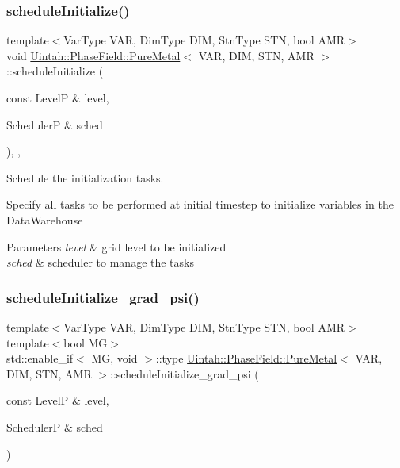\subsubsection{\texorpdfstring{schedule\+Initialize()}{scheduleInitialize()}}
{\footnotesize\ttfamily template$<$Var\+Type V\+AR, Dim\+Type D\+IM, Stn\+Type S\+TN, bool A\+MR$>$ \\
void \hyperlink{classUintah_1_1PhaseField_1_1PureMetal}{Uintah\+::\+Phase\+Field\+::\+Pure\+Metal}$<$ V\+AR, D\+IM, S\+TN, A\+MR $>$\+::schedule\+Initialize (\begin{DoxyParamCaption}\item[{const LevelP \&}]{level,  }\item[{SchedulerP \&}]{sched }\end{DoxyParamCaption})\hspace{0.3cm}{\ttfamily [override]}, {\ttfamily [protected]}, {\ttfamily [virtual]}}



Schedule the initialization tasks. 

Specify all tasks to be performed at initial timestep to initialize variables in the Data\+Warehouse


\begin{DoxyParams}{Parameters}
{\em level} & grid level to be initialized \\
\hline
{\em sched} & scheduler to manage the tasks \\
\hline
\end{DoxyParams}
\mbox{\label{classUintah_1_1PhaseField_1_1PureMetal_a08fd26626ff3782a5805db3725d2da25}} 
\subsubsection{\texorpdfstring{schedule\+Initialize\+\_\+grad\+\_\+psi()}{scheduleInitialize\_grad\_psi()}\hspace{0.1cm}{\footnotesize\ttfamily [1/2]}}
{\footnotesize\ttfamily template$<$Var\+Type V\+AR, Dim\+Type D\+IM, Stn\+Type S\+TN, bool A\+MR$>$ \\
template$<$bool MG$>$ \\
std\+::enable\+\_\+if$<$ MG, void $>$\+::type \hyperlink{classUintah_1_1PhaseField_1_1PureMetal}{Uintah\+::\+Phase\+Field\+::\+Pure\+Metal}$<$ V\+AR, D\+IM, S\+TN, A\+MR $>$\+::schedule\+Initialize\+\_\+grad\+\_\+psi (\begin{DoxyParamCaption}\item[{const LevelP \&}]{level,  }\item[{SchedulerP \&}]{sched }\end{DoxyParamCaption})\hspace{0.3cm}{\ttfamily [protected]}}



